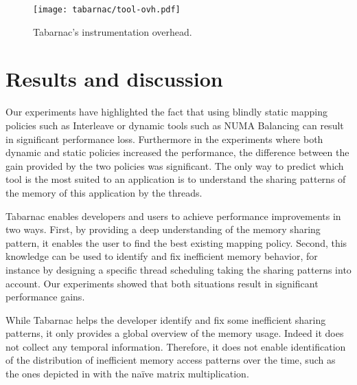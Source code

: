 \begin{figure}[htb]
    \centering
    \texttt{[image: tabarnac/tool-ovh.pdf]}
    \caption{Tabarnac's instrumentation overhead.}
    \label{fig:ovh-tabarnac}
\end{figure}

\section{Results and discussion}
\label{sec:tab-cncl}

Our experiments have highlighted the fact that using blindly static mapping policies such as Interleave or dynamic tools such as \gls{NUMA} Balancing can result in significant performance loss.
Furthermore in the experiments where both dynamic and static policies increased the performance, the difference between the gain provided by the two policies was significant.
The only way to predict which tool is the most suited to an application is to understand the sharing patterns of the memory of this application by the threads.

\gls{Tabarnac} enables developers and users to achieve performance improvements in two ways.
First, by providing a deep understanding of the memory sharing pattern, it enables the user to find the best existing mapping policy.
Second, this knowledge can be used to identify and fix inefficient memory behavior, for instance by designing a specific thread scheduling taking the sharing patterns into account.
Our experiments showed that both situations result in significant performance gains.

While \gls{Tabarnac} helps the developer identify and fix some inefficient sharing patterns, it only provides a global overview of the memory usage.
Indeed it does not collect any temporal information.
Therefore, it does not enable identification of the distribution of inefficient memory access patterns over the time, such as the ones depicted in  with the naïve matrix multiplication.

